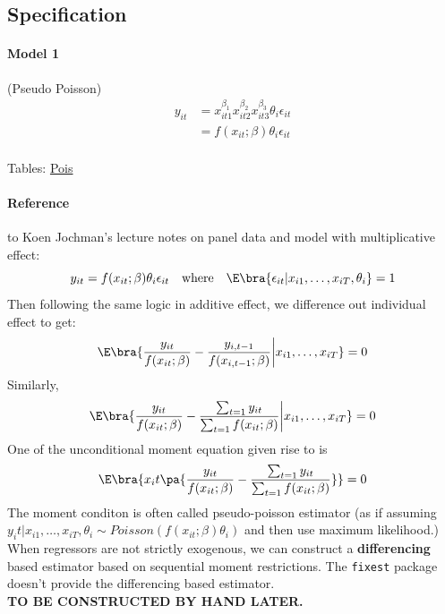 \subsection{Specification}\hypertarget{home}{}
\paragraph{Model 1} (Pseudo Poisson)
\begin{equation*}
    \begin{split}
        y_{it}&=x_{it1}^{\beta_1}x_{it2}^{\beta_2}x_{it3}^{\beta_3}\theta_i\epsilon_{it}\\
        &= f(x_{it};\beta)\theta_i\epsilon_{it}\\
    \end{split}
\end{equation*}

Tables: \hyperlink{reg_inf_pois_2022}{Pois}

\paragraph{Reference} to Koen Jochman's lecture notes on panel data and model with multiplicative
effect:
\begin{equation*}
    y_{it}=f(x_{it};\beta)\theta_i\epsilon_{it} \quad \text{where} \quad \E\bra{\epsilon_{it}|x_{i1},\ldots,x_{iT},\theta_i}=1
\end{equation*}
Then following the same logic in additive effect, we difference out individual effect to get:
\begin{equation*}
    \E\bra{\frac{y_{it}}{f(x_{it};\beta)}-\frac{y_{i,t-1}}{f(x_{i,t-1};\beta)}\bigg | x_{i1},\ldots,x_{iT}}=0
\end{equation*}
Similarly, \begin{equation*}
    \E\bra{\frac{y_{it}}{f(x_{it};\beta)}-\frac{\sum_{t=1}y_{it}}{\sum_{t=1}f(x_{it};\beta)}\bigg | x_{i1},\ldots,x_{iT}}=0
\end{equation*}
One of the unconditional moment equation given rise to is \begin{equation}
    \E\bra{x_it\pa{\frac{y_{it}}{f(x_{it};\beta)}-\frac{\sum_{t=1}y_{it}}{\sum_{t=1}f(x_{it};\beta)}}}=0
\end{equation}
The moment conditon is often called pseudo-poisson estimator (as if assuming $y_it|x_{i1},\ldots,x_{iT},\theta_i\sim Poisson(f(x_{it};\beta)\theta_i)$ and then use maximum likelihood.)
When regressors are not strictly exogenous, we can construct a \textbf{differencing} based estimator based on sequential moment restrictions.
The \verb+fixest+ package doesn't provide the differencing based estimator. \\
\textbf{TO BE CONSTRUCTED BY HAND LATER.}

